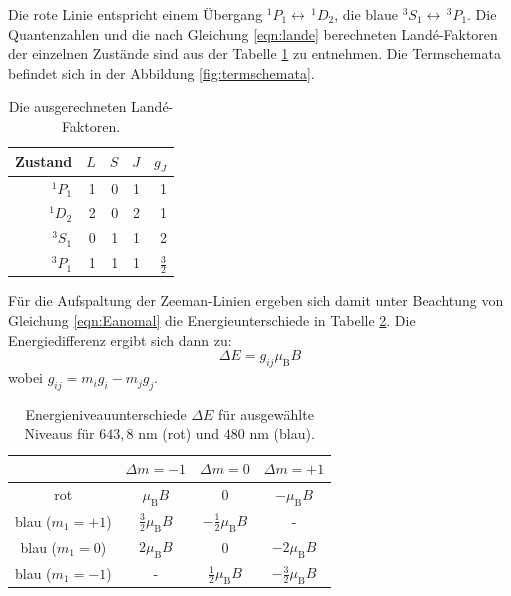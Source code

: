 \documentclass{article}
\begin{document}
	Die rote Linie entspricht einem Übergang $^1P_1\longleftrightarrow\,^1D_2$, die blaue $^3S_1\longleftrightarrow\,^3P_1$. Die Quantenzahlen und die nach Gleichung \eqref{eqn:lande} berechneten Landé-Faktoren der einzelnen Zustände sind aus der Tabelle \ref{tab:lande} zu entnehmen.
	Die Termschemata befindet sich in der Abbildung \ref{fig:termschemata}. 
	\begin{table}[h!]
		\centering
		\begin{tabular}{r|rrr|r}
			\hline\hline
			Zustand & $L$	&	$S$	&	$J$	&	$g_J$\\
			\hline\hline
			$^1P_1$ &	1	&	0	&	1	&	1\\
			$^1D_2$ &	2	&	0	&	2	&	1\\
			$^3S_1$ &	0	&	1	&	1	&	2\\
			$^3P_1$ &	1	&	1	&	1	&	$\frac{3}{2}$\\
			\hline
		\end{tabular}
		\caption{Die ausgerechneten Landé-Faktoren.}
		\label{tab:lande}
	\end{table}
	
	Für die Aufspaltung der Zeeman-Linien ergeben sich damit unter Beachtung von Gleichung \ref{eqn:Eanomal} die Energieunterschiede in Tabelle \ref{tabenergy}. Die Energiedifferenz ergibt sich dann zu:
	\begin{equation}
	\Delta E = g_{ij} \mu_\text{B} B
	\end{equation}
	wobei $g_{ij} = m_ig_i-m_jg_j$.
	\begin{table}[h]
		\begin{center}
			\begin{tabular}{c|ccc}
				&$\Delta m = -1$&$\Delta m = 0$&$\Delta m = +1$ \\ \hline
				rot & $\mu_{\text{B}} B$ & $0$ & $- \mu_{\text{B}} B$ \\
				blau ($m_1=+1$) & $\frac{3}{2} \mu_{\text{B}} B$ & $-\frac{1}{2} \mu_{\text{B}} B$ & - \\
				blau ($m_1=0$) & $2 \mu_{\text{B}} B$ & 0 & $-2 \mu_{\text{B}} B$ \\
				blau ($m_1=-1$) & - & $\frac{1}{2} \mu_{\text{B}} B$ & $-\frac{3}{2} \mu_{\text{B}} B$
			\end{tabular}
			\caption{Energieniveauunterschiede $\Delta E$ für ausgewählte Niveaus für $643{,}8\text{ nm}$ (rot) und $480 \text{ nm}$ (blau).}
			\label{tabenergy}
		\end{center}
	\end{table}
	
\end{document}
